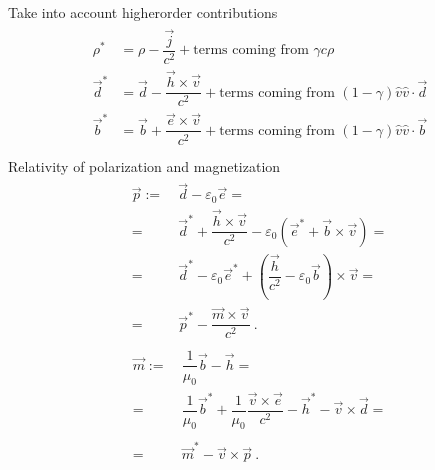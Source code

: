 \documentclass[letterpaper,10pt,english]{jupyterBook}
\begin{document}
\sphinxAtStartPar
{} Take into account higher\sphinxhyphen{}order contributions
\begin{equation*}
\begin{split}\begin{aligned}
  \rho^*    & = \rho    - \dfrac{\vec{j}}{c^2} + \text{terms coming from $\gamma c \rho$} \\
  \vec{d}^* & = \vec{d} - \dfrac{\vec{h} \times \vec{v}}{c^2} + \text{terms coming from $(1-\gamma) \hat{v} \hat{v} \cdot \vec{d}$}  \\
  \vec{b}^* & = \vec{b} + \dfrac{\vec{e} \times \vec{v}}{c^2} + \text{terms coming from $(1-\gamma) \hat{v} \hat{v} \cdot \vec{b}$}  \\
\end{aligned}\end{split}
\end{equation*}
\sphinxAtStartPar
{} Relativity of polarization and magnetization
\begin{equation*}
\begin{split}\begin{aligned}
  \vec{p} 
  := & \  \vec{d} - \varepsilon_0 \vec{e} = \\
   = & \  \vec{d}^* + \dfrac{\vec{h} \times \vec{v}}{c^2} - \varepsilon_0 \left( \vec{e}^* + \vec{b} \times \vec{v} \right) = \\
   = & \  \vec{d}^* - \varepsilon_0 \vec{e}^* + \left( \dfrac{\vec{h}}{c^2} - \varepsilon_0 \vec{b} \right) \times \vec{v} = \\ 
   = & \  \vec{p}^* - \dfrac{ \vec{m} \times \vec{v}}{c^2} \ .
\end{aligned}\end{split}
\end{equation*}\begin{equation*}
\begin{split}\begin{aligned}
  \vec{m} 
  := & \ \dfrac{1}{\mu_0} \vec{b} - \vec{h} = \\
   = & \ \dfrac{1}{\mu_0} \vec{b}^* + \dfrac{1}{\mu_0} \dfrac{\vec{v} \times \vec{e}}{c^2} - \vec{h}^* - \vec{v} \times \vec{d} = \\ \\
   = & \ \vec{m}^* - \vec{v} \times \vec{p} \ .
\end{aligned}\end{split}
\end{equation*}
\end{document}
